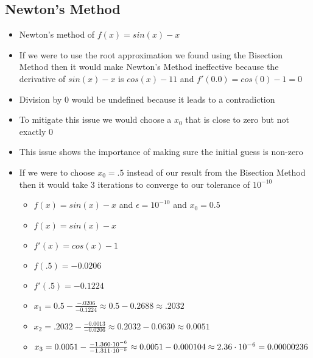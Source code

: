 \documentclass[9pt]{extarticle}
\begin{document}
\subsection{Newton's Method}
\begin{itemize}
    \item Newton's method of $f(x) = sin(x) - x$
    \item If we were to use the root approximation we found using the Bisection Method then it would make Newton's Method ineffective because the derivative of $sin(x) - x$ is $cos(x) -1 1$ and $f'(0.0) = cos(0) - 1 = 0$
    \item Division by 0 would be undefined because it leads to a contradiction 
    \item To mitigate this issue we would choose a $x_0$ that is close to zero but not exactly $0$
    \item This issue shows the importance of making sure the initial guess is non-zero
    \item If we were to choose $x_0 = .5$ instead of our result from the Bisection Method then it would take 3 iterations to converge to our tolerance of $10^{-10}$
    \begin{itemize}
        \item $f(x) = sin(x) - x$ and $\epsilon = 10^{-10}$ and $x_0 = 0.5$
        \item $f(x) = sin(x) -x$
        \item $f'(x) = cos(x) - 1$
        \item $f(.5) = -0.0206$
        \item $f'(.5) = - 0.1224$
        \item $x_1 = 0.5 - \frac{-.0206}{-0.1224} \approx 0.5 - 0.2688 \approx .2032$
        \item $x_2 = .2032 - \frac{-0.0013}{-0.0206} \approx 0.2032 - 0.0630 \approx 0.0051$
        \item $x_3 = 0.0051 - \frac{-1.360 \cdot 10^{-6}}{-1.311 \cdot10^{-5}} 
        \\ \approx 0.0051 - 0.000104 \approx 2.36 \cdot 10^{-6} 
        \\ = 0.00000236$
        
    \end{itemize}
\end{itemize}
\end{document}
